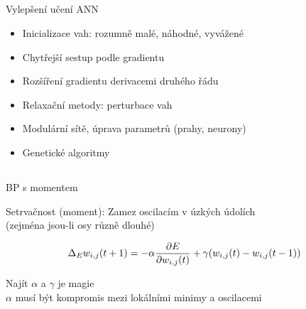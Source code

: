 \documentclass{beamer}
\begin{document}
\subsection{}
\begin{frame}{Vylepšení učení ANN}
\begin{itemize}
\item Inicializace vah: rozumně malé, náhodné, vyvážené
\item Chytřejší sestup podle gradientu
\item Rozšíření gradientu derivacemi druhého řádu
\item Relaxační metody: perturbace vah
\item Modulární sítě, úprava parametrů (prahy, neurony)
\item Genetické algoritmy
\end{itemize}
\end{frame}

\subsection{}
\begin{frame}{BP s momentem}
\begin{center}
Setrvačnost (moment): Zamez oscilacím v úzkých údolích \\
(zejména jsou-li osy různě dlouhé)

$$\Delta_E w_{i,j}(t+1) = -\alpha{\partial E \over \partial w_{i,j}(t)} + \gamma(w_{i,j}(t)-w_{i,j}(t-1))$$

Najít $\alpha$ a $\gamma$ je magie \\
$\alpha$ musí být kompromis mezi lokálními minimy a oscilacemi
\end{center}
\end{frame}
\end{document}
